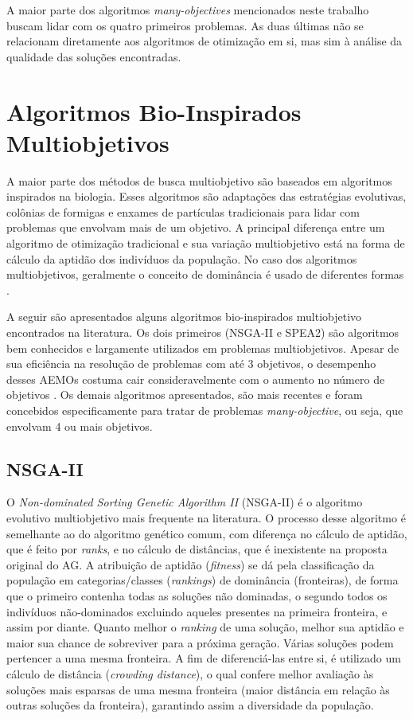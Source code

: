 A maior parte dos algoritmos \textit{many-objectives} mencionados neste trabalho buscam lidar com os quatro primeiros problemas. As duas últimas não se relacionam diretamente aos algoritmos de otimização em si, mas sim à análise da qualidade das soluções encontradas.

\section{Algoritmos Bio-Inspirados Multiobjetivos}

A maior parte dos métodos de busca multiobjetivo são baseados em algoritmos inspirados na biologia. Esses algoritmos são adaptações das estratégias evolutivas, colônias de formigas e enxames de partículas tradicionais para lidar com problemas que envolvam mais de um objetivo. A principal diferença entre um algoritmo de otimização tradicional e sua variação multiobjetivo está na forma de cálculo da aptidão dos indivíduos da população. No caso dos algoritmos multiobjetivos, geralmente o conceito de dominância é usado de diferentes formas \cite{Bueno2010}.

A seguir são apresentados alguns algoritmos bio-inspirados multiobjetivo encontrados na literatura. Os dois primeiros (NSGA-II e SPEA2) são algoritmos bem conhecidos e largamente utilizados em problemas multiobjetivos. Apesar de sua eficiência na resolução de problemas com até 3 objetivos, o desempenho desses AEMOs costuma cair consideravelmente com o aumento no número de objetivos \cite{Franca2017}. Os demais algoritmos apresentados, são mais recentes e foram concebidos especificamente para tratar de problemas \textit{many-objective}, ou seja, que envolvam 4 ou mais objetivos.

\subsection{NSGA-II}
O \textit{Non-dominated Sorting Genetic Algorithm II} (NSGA-II) \cite{Deb2002} é o algoritmo evolutivo multiobjetivo mais frequente na literatura. O processo desse algoritmo é semelhante ao do algoritmo genético comum, com diferença no cálculo de aptidão, que é feito por \textit{ranks}, e no cálculo de distâncias, que é inexistente na proposta original do AG. A atribuição de aptidão (\textit{fitness}) se dá pela classificação da população em categorias/classes (\textit{rankings}) de dominância (fronteiras), de forma que o primeiro contenha todas as soluções não dominadas, o segundo todos os indivíduos não-dominados excluindo aqueles presentes na primeira fronteira, e assim por diante. Quanto melhor o \textit{ranking} de uma solução, melhor sua aptidão e  maior sua chance de sobreviver para a próxima geração. Várias soluções podem pertencer a uma mesma fronteira. A fim de diferenciá-las entre si, é utilizado um cálculo de distância (\textit{crowding distance}), o qual confere melhor avaliação às soluções mais esparsas de uma mesma fronteira (maior distância em relação às outras soluções da fronteira), garantindo assim a diversidade da população.

